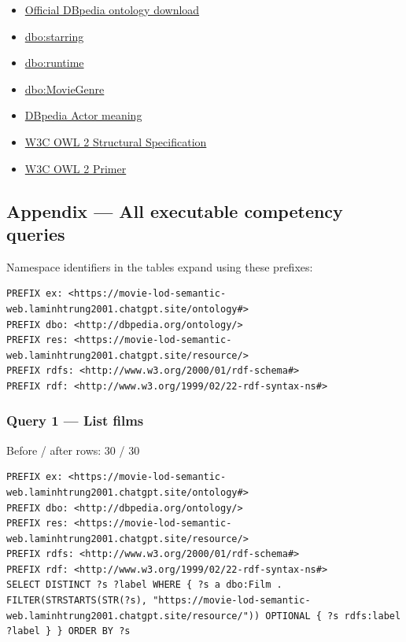 \documentclass[
  11pt,
]{article}
\providecommand{\tightlist}{%
  \setlength{\itemsep}{0pt}\setlength{\parskip}{0pt}}
\begin{document}
\begin{itemize}
\tightlist
\item
  \href{https://downloads.dbpedia.org/2016-10/dbpedia_2016-10.owl}{Official
  DBpedia ontology download}
\item
  \href{https://dbpedia.org/ontology/starring}{dbo:starring}
\item
  \href{https://dbpedia.org/ontology/runtime}{dbo:runtime}
\item
  \href{https://dbpedia.org/ontology/MovieGenre}{dbo:\allowbreak{}\allowbreak{}Movi\allowbreak{}e\allowbreak{}Genre}
\item
  \href{https://mappings.dbpedia.org/server/ontology/classes/Actor}{DBpedia
  Actor meaning}
\item
  \href{https://www.w3.org/TR/owl2-syntax/}{W3C OWL 2 Structural
  Specific\allowbreak{}ation}
\item
  \href{https://www.w3.org/TR/owl2-primer/}{W3C OWL 2 Primer}
\end{itemize}

\subsection{Appendix --- All executable competency
queries}\label{appendix-all-executable-competency-queries}

Namespace identifiers in the tables expand using these prefixes:

\begin{verbatim}
PREFIX ex: <https://movie-lod-semantic-web.laminhtrung2001.chatgpt.site/ontology#>
PREFIX dbo: <http://dbpedia.org/ontology/>
PREFIX res: <https://movie-lod-semantic-web.laminhtrung2001.chatgpt.site/resource/>
PREFIX rdfs: <http://www.w3.org/2000/01/rdf-schema#>
PREFIX rdf: <http://www.w3.org/1999/02/22-rdf-syntax-ns#>
\end{verbatim}

\subsubsection{Query 1 --- List films}\label{query-1-list-films}

Before / after rows: 30 / 30

\begin{verbatim}
PREFIX ex: <https://movie-lod-semantic-web.laminhtrung2001.chatgpt.site/ontology#>
PREFIX dbo: <http://dbpedia.org/ontology/>
PREFIX res: <https://movie-lod-semantic-web.laminhtrung2001.chatgpt.site/resource/>
PREFIX rdfs: <http://www.w3.org/2000/01/rdf-schema#>
PREFIX rdf: <http://www.w3.org/1999/02/22-rdf-syntax-ns#>
SELECT DISTINCT ?s ?label WHERE { ?s a dbo:Film . FILTER(STRSTARTS(STR(?s), "https://movie-lod-semantic-web.laminhtrung2001.chatgpt.site/resource/")) OPTIONAL { ?s rdfs:label ?label } } ORDER BY ?s
\end{verbatim}
\end{document}
